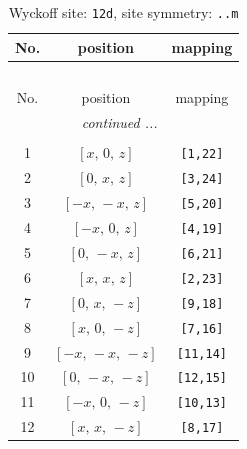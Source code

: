 \documentclass[fleqn,8pt]{jsarticle}
\begin{document}
\renewcommand{\arraystretch}{1.2}
\begin{longtable}{ccc}
\caption{Wyckoff site: {\tt 12d}, site symmetry: {\tt ..m}}
 \\
 \hline \hline
No. & position & mapping \\ \hline \endfirsthead

\multicolumn{2}{l}{\tablename\ \thetable{}} \\
 \hline \hline
No. & position & mapping \\ \hline \endhead

 \hline \hline
\multicolumn{2}{r}{\footnotesize\it continued ...} \\ \endfoot

 \hline \hline
\multicolumn{2}{r}{} \\ \endlastfoot

1 & $\left[ x,\, 0,\, z \right]$ & {\tt [1,22]} \\ \hline
2 & $\left[ 0,\, x,\, z \right]$ & {\tt [3,24]} \\ \hline
3 & $\left[ - x,\, - x,\, z \right]$ & {\tt [5,20]} \\ \hline
4 & $\left[ - x,\, 0,\, z \right]$ & {\tt [4,19]} \\ \hline
5 & $\left[ 0,\, - x,\, z \right]$ & {\tt [6,21]} \\ \hline
6 & $\left[ x,\, x,\, z \right]$ & {\tt [2,23]} \\ \hline
7 & $\left[ 0,\, x,\, - z \right]$ & {\tt [9,18]} \\ \hline
8 & $\left[ x,\, 0,\, - z \right]$ & {\tt [7,16]} \\ \hline
9 & $\left[ - x,\, - x,\, - z \right]$ & {\tt [11,14]} \\ \hline
10 & $\left[ 0,\, - x,\, - z \right]$ & {\tt [12,15]} \\ \hline
11 & $\left[ - x,\, 0,\, - z \right]$ & {\tt [10,13]} \\ \hline
12 & $\left[ x,\, x,\, - z \right]$ & {\tt [8,17]} \\
\end{longtable}
\renewcommand{\arraystretch}{1.2}
\end{document}
